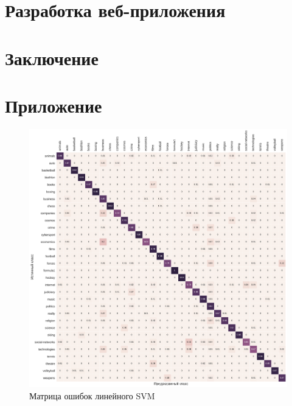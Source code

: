 \documentclass[a4paper, 14pt]{extarticle}
\begin{document}
\section{Разработка веб-приложения}



\section{Заключение}


\setcounter{secnumdepth}{0}
\section{Приложение}
\begin{figure}[h!]
	\centering
	\includegraphics[width=1\textwidth]{svm_confusion_matrix.pdf}
	\caption{Матрица ошибок линейного SVM}
	\label{svm_confusion}
\end{figure}
\end{document}
